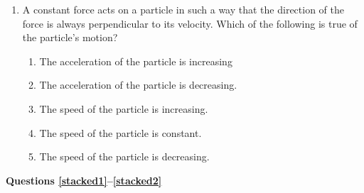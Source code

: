\documentclass{../../../oss-apphys}
\begin{document}
\begin{multicols}{2}
\begin{enumerate}[resume,leftmargin=18pt]
  \item A constant force acts on a particle in such a way that the direction of
    the force is always perpendicular to its velocity. Which of the
    following is true of the particle's motion?
    \begin{enumerate}[nosep,leftmargin=18pt,label=(\Alph*)]
    \item The acceleration of the particle is increasing
    \item The acceleration of the particle is decreasing.
    \item The speed of the particle is increasing.
    \item The speed of the particle is constant.
    \item The speed of the particle is decreasing.
    \end{enumerate}
    \vspace{.7in}
    
  \end{enumerate}
  
  \textbf{Questions \ref{stacked1}--\ref{stacked2}}


\end{multicols}
\end{document}
